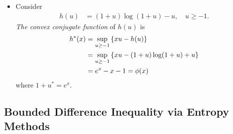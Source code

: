 \documentclass[11pt]{article}
\begin{document}
\begin{itemize}
\item \begin{remark}
Consider
\begin{align*}
h(u) &= (1+ u)\log(1 + u) - u, \quad u \ge -1.
\end{align*}  \emph{The convex conjugate function} of $h(u)$ is
\begin{align*}
h^{*}(x) &= \sup_{u \ge -1}\left\{x u - h(u)\right\} \\
&=  \sup_{u \ge -1}\left\{x u - (1+ u)\log(1 + u) + u\right\} \\
&= e^x - x - 1 = \phi(x)
\end{align*} where $1+ u^{*}= e^{x}$. 
\end{remark}

\end{itemize}

\subsection{Bounded Difference Inequality via Entropy Methods}
\end{document}
